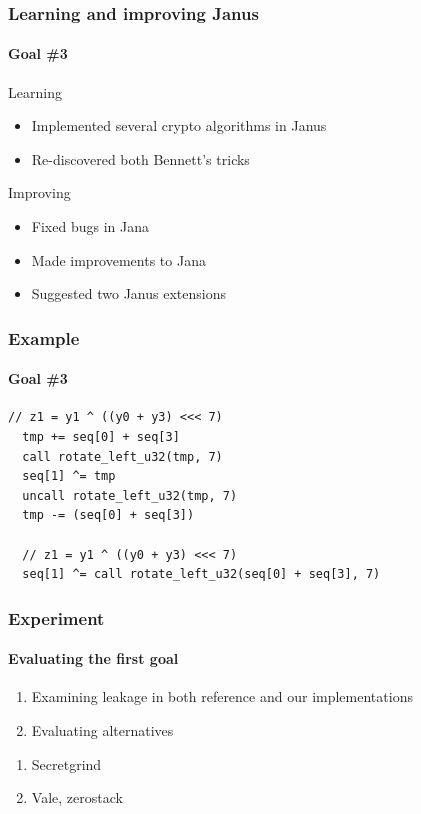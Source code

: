 \documentclass{beamer}
\begin{document}
\addtocounter{page}{1}
\begin{frame}
\addtocounter{page}{-1}
\frametitle{Learning and improving Janus}
\framesubtitle{\hspace{5mm}Goal \#3} 

\pause
\begin{block}{Learning}
\begin{itemize}
\item Implemented several crypto algorithms in Janus
\item Re-discovered both Bennett's tricks
\end{itemize}
\end{block}

\pause
\begin{block}{Improving}
\begin{itemize}
\item Fixed bugs in Jana
\item Made improvements to Jana
\item Suggested two Janus extensions
\end{itemize}
\end{block}

\end{frame}



\addtocounter{page}{1}
\begin{frame}[fragile]
\addtocounter{page}{-1}
\frametitle{Example}
\framesubtitle{\hspace{5mm}Goal \#3} 

\begin{lstlisting}[language=Janus]
  // z1 = y1 ^ ((y0 + y3) <<< 7)
  tmp += seq[0] + seq[3]
  call rotate_left_u32(tmp, 7)
  seq[1] ^= tmp
  uncall rotate_left_u32(tmp, 7)
  tmp -= (seq[0] + seq[3])
  
  // z1 = y1 ^ ((y0 + y3) <<< 7)
  seq[1] ^= call rotate_left_u32(seq[0] + seq[3], 7)
\end{lstlisting}

\end{frame}




\addtocounter{page}{1}
\begin{frame}
\addtocounter{page}{-1}
\frametitle{Experiment}
\framesubtitle{\hspace{5mm}Evaluating the first goal} 

\pause
\begin{enumerate}
\item Examining leakage in both reference and our implementations
\item Evaluating alternatives
\end{enumerate}

\pause
\begin{enumerate}
\item Secretgrind
\item Vale, zerostack
\end{enumerate}

\end{frame}
\end{document}
